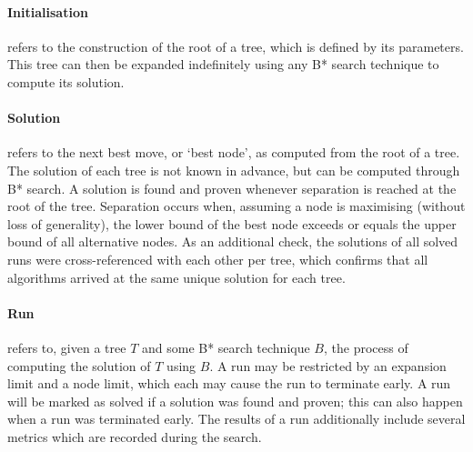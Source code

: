\paragraph{Initialisation}
refers to the construction of the root of a tree, which is defined by its parameters. This tree can then be expanded indefinitely using any B* search technique to compute its solution.
\paragraph{Solution}
refers to the next best move, or `best node', as computed from the root of a tree. The solution of each tree is not known in advance, but can be computed through B* search. A solution is found and proven whenever separation \cite{Berliner1979} is reached at the root of the tree. Separation occurs when, assuming a node is maximising (without loss of generality), the lower bound of the best node exceeds or equals the upper bound of all alternative nodes. As an additional check, the solutions of all solved runs were cross-referenced with each other per tree, which confirms that all algorithms arrived at the same unique solution for each tree.
\paragraph{Run}
refers to, given a tree $T$ and some B* search technique $B$, the process of computing the solution of $T$ using $B$. A run may be restricted by an expansion limit and a node limit, which each may cause the run to terminate early. A run will be marked as solved if a solution was found and proven; this can also happen when a run was terminated early. The results of a run additionally include several metrics which are recorded during the search.
